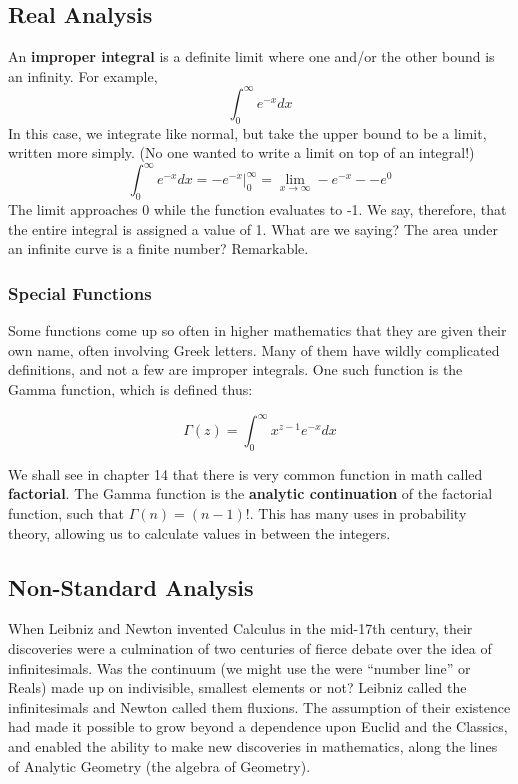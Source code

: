 
\subsection{Real Analysis}



An \textbf{improper integral} is a definite limit where one and/or the other bound is
an infinity.  For example, 
$$
\int_0^\infty e^{-x}dx
$$
In this case, we integrate like normal, but take the upper bound to be a limit, 
written more simply.  (No one wanted to write a limit on top of an integral!)  
$$
\int_0^\infty e^{-x}dx = \left.-e^{-x}\right|_0^\infty = \lim_{x\rightarrow\infty} -e^{-x} - -e^0
$$
The limit approaches 0 while the function evaluates to -1.  We say, therefore, that
the entire integral is assigned a value of 1.  What are we saying?  The area under
an infinite curve is a finite number?  Remarkable.

\subsubsection{Special Functions}
Some functions come up so often in higher mathematics that they are given
their own name, often involving Greek letters.  Many of them have wildly 
complicated definitions, and not a few are improper integrals.  One such
function is the Gamma function, which is defined thus:

\begin{equation}
\Gamma(z)=\int_{0}^{\infty}x^{z-1}e^{-x}dx
\end{equation}

We shall see in chapter 14 that there is very common function in math called
\textbf{factorial}.  The Gamma function is the \textbf{analytic continuation} of
the factorial function, such that $\Gamma(n) = (n-1)!$.  This has many uses in
probability theory, allowing us to calculate values in between the integers.


\subsection{Non-Standard Analysis}
When Leibniz and Newton invented Calculus in the mid-17th century, their discoveries were
a culmination of two centuries of fierce debate over the idea of infinitesimals.  Was the
continuum (we might use the were ``number line'' or Reals) made up on indivisible, smallest
elements or not?  Leibniz called the infinitesimals and Newton called them fluxions.  
The assumption of their existence had made it possible to grow beyond a dependence
upon Euclid and the Classics, and enabled the ability to make new discoveries in 
mathematics, along the lines of Analytic Geometry (the algebra of Geometry).


